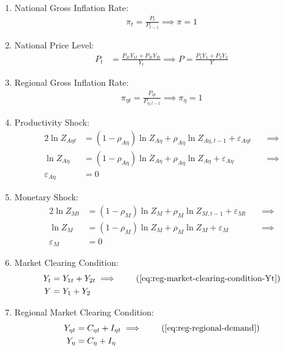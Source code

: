 \documentclass[../thesis.tex]{subfiles}
\begin{document}
\begin{enumerate}
	\item National Gross Inflation Rate:
	\begin{align}
		\pi_t = \frac{P_t}{P_{t-1}} \implies \pi = 1 \label{eq:reg-ss-gross-inflation-rate}
	\end{align}
	
	\item National Price Level:
	\begin{align}
		P_t &= \frac{P_{1t} Y_{1t} + P_{2t} Y_{2t}}{Y_{t}} \implies P = \frac{P_{1} Y_{1} + P_{2} Y_{2}}{Y_{}} \label{eq:ss-national-price-level} %
	\end{align}
	
	\item Regional Gross Inflation Rate:
	\begin{align}
		\pi_{\eta t} = \frac{P_{\eta t}}{P_{\eta, t-1}} \implies \pi_{\eta} = 1 \label{eq:ss-regional-inflation}
	\end{align}
	
	\item Productivity Shock:
	\begin{alignat}{2}
		\ln{Z_{A\eta t}} &= (1 -\rho_{A\eta}) \ln{Z_{A\eta}} + \rho_{A\eta} \ln{Z_{A\eta,t-1}} + \varepsilon_{A\eta t} \quad &\implies \nonumber \\
		\ln{Z_{A\eta}} &= (1 -\rho_{A\eta}) \ln{Z_{A\eta}} + \rho_{A\eta} \ln{Z_{A\eta}} + \varepsilon_{A\eta} &\implies \nonumber \\
		\varepsilon_{A\eta} &= 0 \label{eq:reg-ss-productivity-shock}
	\end{alignat}
	
	\item Monetary Shock:
	\begin{alignat}{2}
		\ln{Z_{Mt}} &= (1-\rho_M)\ln{Z_{M}} + \rho_M\ln{Z_{M,t-1}} + \varepsilon_{Mt} \quad &\implies \nonumber \\
		\ln{Z_{M}} &= (1-\rho_M)\ln{Z_{M}} + \rho_M\ln{Z_{M}} + \varepsilon_{M} &\implies \nonumber \\
		\varepsilon_{M} &= 0 \label{eq:reg-ss-monetary-shock}
	\end{alignat}
	
	\item Market Clearing Condition:
	\begin{align}
		Y_{t} &= Y_{1 t} + Y_{2 t} \implies \tag{\ref{eq:reg-market-clearing-condition-Yt}} \\
		Y &= Y_{1} + Y_{2} \label{eq:reg-ss-market-clearing-condition}
	\end{align}
	
	\item Regional Market Clearing Condition:
	\begin{align}
		Y_{\eta t} &= C_{\eta t} + I_{\eta t} \implies \tag{\ref{eq:reg-regional-demand}} \\
		Y_{\eta} &= C_{\eta} + I_{\eta} \label{eq:reg-ss-total-yn}
	\end{align}
	
\end{enumerate}
\end{document}
